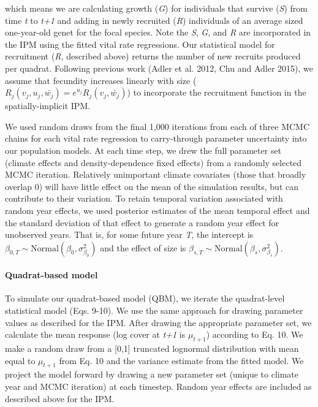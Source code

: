 \documentclass[12pt,]{article}
\let\oldparagraph\paragraph
\renewcommand{\paragraph}[1]{\oldparagraph{#1}\mbox{}}
\begin{document}
which means we are calculating growth (\emph{G}) for individuals that
survive (\emph{S}) from time \emph{t} to \emph{t+1} and adding in newly
recruited (\emph{R}) individuals of an average sized one-year-old genet
for the focal species. Note the \emph{S}, \emph{G}, and \emph{R} are
incorporated in the IPM using the fitted vital rate regressions. Our
statistical model for recruitment (\emph{R}, described above) returns
the number of new recruits produced per quadrat. Following previous work
(Adler et al. 2012, Chu and Adler 2015), we assume that fecundity
increases linearly with size
(\(R_j(v_{j},u_{j},\bar{w_{j}}) = e^{u_j}R_j(v_{j},\bar{w_{j}})\)) to
incorporate the recruitment function in the spatially-implicit IPM.

We used random draws from the final 1,000 iterations from each of three
MCMC chains for each vital rate regression to carry-through parameter
uncertainty into our population models. At each time step, we drew the
full parameter set (climate effects and density-dependence fixed
effects) from a randomly selected MCMC iteration. Relatively unimportant
climate covariates (those that broadly overlap 0) will have little
effect on the mean of the simulation results, but can contribute to
their variation. To retain temporal variation associated with random
year effects, we used posterior estimates of the mean temporal effect
and the standard deviation of that effect to generate a random year
effect for unobserved years. That is, for some future year \emph{T}, the
intercept is
\(\beta_{0,T} \sim \text{Normal}(\beta_0, \sigma_{\beta_0}^2)\) and the
effect of size is
\(\beta_{s,T} \sim \text{Normal}(\beta_s, \sigma_{\beta_s}^2)\).

\paragraph{Quadrat-based model}\label{quadrat-based-model}

To simulate our quadrat-based model (QBM), we iterate the quadrat-level
statistical model (Eqs. 9-10). We use the same approach for drawing
parameter values as described for the IPM. After drawing the appropriate
parameter set, we calculate the mean response (log cover at \emph{t+1}
is \(\mu_{t+1}\)) according to Eq. 10. We make a random draw from a
{[}0,1{]} truncated lognormal distribution with mean equal to
\(\mu_{t+1}\) from Eq. 10 and the variance estimate from the fitted
model. We project the model forward by drawing a new parameter set
(unique to climate year and MCMC iteration) at each timestep. Random
year effects are included as described above for the IPM.
\end{document}

